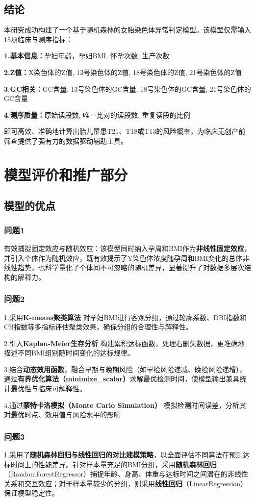 \documentclass{article}
\begin{document}
\subsection{\textbf{结论}}
本研究成功构建了一个基于随机森林的女胎染色体异常判定模型。该模型仅需输入15项临床与测序指标：

\textbf{1.基本信息：}孕妇年龄，孕妇BMI, 怀孕次数, 生产次数

\textbf{2.Z值：}X染色体的Z值, 13号染色体的Z值, 18号染色体的Z值, 21号染色体的Z值

\textbf{3.GC相关：}GC含量,  13号染色体的GC含量, 18号染色体的GC含量, 21号染色体的GC含量

\textbf{4.测序质量：}原始读段数, 唯一比对的读段数, 重复读段的比例

即可高效、准确地计算出胎儿罹患T21、T18或T13的风险概率，为临床无创产前筛查提供了强有力的数据驱动辅助工具。
\section{\textbf{模型评价和推广部分}}
\subsection{\textbf{模型的优点}}
\subsubsection{\textbf{问题1}}
有效捕捉固定效应与随机效应：该模型同时纳入孕周和BMI作为\textbf{非线性固定效应}，并引入个体作为随机效应，既有效揭示了Y染色体浓度随孕周和BMI变化的总体非线性趋势，也科学量化了个体间不可忽略的随机差异，显著提升了对数据多层次结构的解释力。
\subsubsection{\textbf{问题2}}
1.采用\textbf{K-means聚类算法} 对孕妇BMI进行客观分组，通过轮廓系数、DBI指数和CH指数等多指标评估聚类效果，确保分组的合理性与解释性。

2.引入\textbf{Kaplan-Meier生存分析} 构建累积达标函数，处理右删失数据，更准确地描述不同BMI组别随时间变化的达标规律。

3.结合\textbf{动态效用函数}，融合早期与晚期风险（如早检风险递减、晚检风险递增），通过\textbf{有界优化算法（minimize\_scalar）}求解最优检测时间，使模型输出兼具统计最优性与临床可解释性。

4.通过\textbf{蒙特卡洛模拟（Monte Carlo Simulation）} 模拟检测时间误差，分析其对最优时点、效用值与风险水平的影响
\subsubsection{\textbf{问题3}}
1.采用了\textbf{随机森林回归与线性回归的对比建模策略}，以全面评估不同算法在预测达标时间上的性能差异。针对样本量充足的BMI分组，采用\textbf{随机森林回归}（RandomForestRegressor）捕捉年龄、身高、体重与达标时间之间潜在的非线性关系和交互效应；对于样本量较少的分组，则采用\textbf{线性回归}（LinearRegression）保证模型稳定性。
\end{document}

